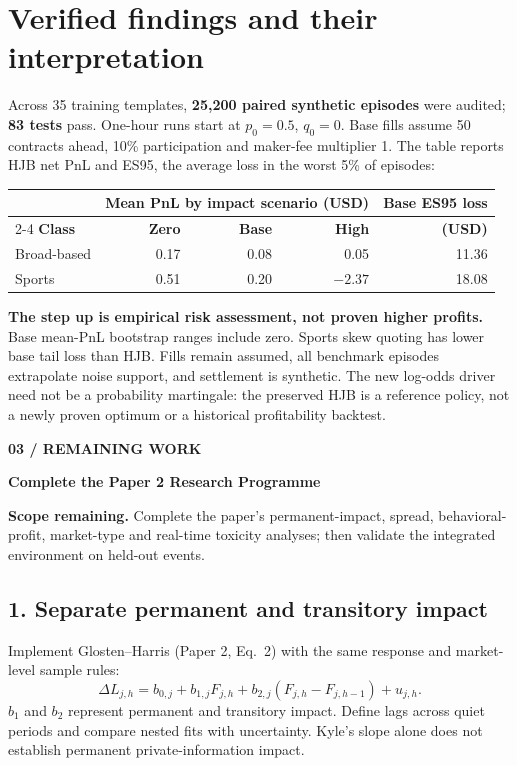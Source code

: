 \documentclass[11pt,letterpaper]{article}
\newcommand{\pagebanner}[2]{%
  {\sffamily\footnotesize\bfseries\color{teal} #1\par}\vspace{3pt}%
  {\sffamily\fontsize{20}{23}\selectfont\bfseries\color{navy} #2\par}\vspace{5pt}}
\newcommand{\takeaway}[1]{%
  \begingroup\setlength{\fboxsep}{8pt}%
  \colorbox{pale}{\parbox{\dimexpr\linewidth-16pt\relax}{#1}}\par\endgroup}
\begin{document}
\section{Verified findings and their interpretation}
Across 35 training templates, \textbf{25,200 paired synthetic episodes} were audited; \textbf{83 tests} pass. One-hour runs start at $p_0=0.5$, $q_0=0$. Base fills assume 50 contracts ahead, 10\% participation and maker-fee multiplier 1. The table reports HJB net PnL and ES95, the average loss in the worst 5\% of episodes:
\begin{center}
\small
\begin{tabular}{@{}lrrrr@{}}
\toprule
 & \multicolumn{3}{c}{\textbf{Mean PnL by impact scenario (USD)}} & \textbf{Base ES95 loss}\\
\cmidrule(lr){2-4}
\textbf{Class} & \textbf{Zero} & \textbf{Base} & \textbf{High} & \textbf{(USD)}\\
\midrule
Broad-based & 0.17 & 0.08 & 0.05 & 11.36\\
Sports      & 0.51 & 0.20 & $-2.37$ & 18.08\\
\bottomrule
\end{tabular}
\end{center}
\textbf{The step up is empirical risk assessment, not proven higher profits.} Base mean-PnL bootstrap ranges include zero. Sports skew quoting has lower base tail loss than HJB. Fills remain assumed, all benchmark episodes extrapolate noise support, and settlement is synthetic. The new log-odds driver need not be a probability martingale: the preserved HJB is a reference policy, not a newly proven optimum or a historical profitability backtest.

\newpage
\pagebanner{03 / REMAINING WORK}{Complete the Paper 2 Research Programme}
\takeaway{\textbf{Scope remaining.} Complete the paper's permanent-impact, spread, behavioral-profit, market-type and real-time toxicity analyses; then validate the integrated environment on held-out events.}

\subsection{1. Separate permanent and transitory impact}
Implement Glosten--Harris (Paper 2, Eq.~2) with the same response and market-level sample rules:
\begin{equation}
 \Delta L_{j,h}=b_{0,j}+b_{1,j}F_{j,h}
 +b_{2,j}(F_{j,h}-F_{j,h-1})+u_{j,h}.
 \label{eq:gh}
\end{equation}
$b_1$ and $b_2$ represent permanent and transitory impact. Define lags across quiet periods and compare nested fits with uncertainty. Kyle's slope alone does not establish permanent private-information impact.
\end{document}
